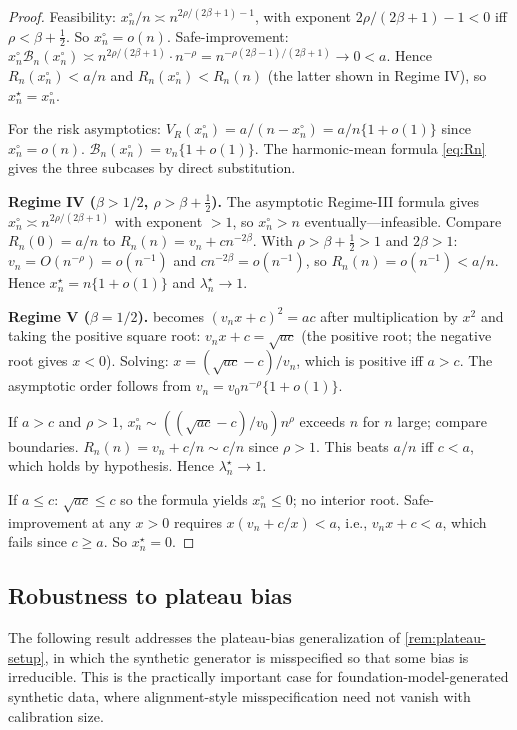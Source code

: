 \documentclass[11pt]{article}
\theoremstyle{plain}
\theoremstyle{definition}
\theoremstyle{remark}
\begin{document}
\begin{proof}
Feasibility: $x_n^\circ/n\asymp n^{2\rho/(2\beta+1)-1}$, with exponent $2\rho/(2\beta+1)-1<0$ iff $\rho<\beta+\tfrac12$. So $x_n^\circ=o(n)$. Safe-improvement: $x_n^\circ\mathcal{B}_n(x_n^\circ)\asymp n^{2\rho/(2\beta+1)}\cdot n^{-\rho}=n^{-\rho(2\beta-1)/(2\beta+1)}\to0<a$. Hence $R_n(x_n^\circ)<a/n$ and $R_n(x_n^\circ)<R_n(n)$ (the latter shown in Regime IV), so $x_n^\star=x_n^\circ$.

For the risk asymptotics: $V_R(x_n^\circ)=a/(n-x_n^\circ)=a/n\{1+o(1)\}$ since $x_n^\circ=o(n)$. $\mathcal{B}_n(x_n^\circ)=v_n\{1+o(1)\}$. The harmonic-mean formula \cref{eq:Rn} gives the three subcases by direct substitution.

\medskip
\noindent\textbf{Regime IV ($\beta>1/2$, $\rho>\beta+\tfrac12$).}
The asymptotic Regime-III formula gives $x_n^\circ\asymp n^{2\rho/(2\beta+1)}$ with exponent $>1$, so $x_n^\circ>n$ eventually---infeasible. Compare $R_n(0)=a/n$ to $R_n(n)=v_n+cn^{-2\beta}$. With $\rho>\beta+\tfrac12>1$ and $2\beta>1$: $v_n=O(n^{-\rho})=o(n^{-1})$ and $cn^{-2\beta}=o(n^{-1})$, so $R_n(n)=o(n^{-1})<a/n$. Hence $x_n^\star=n\{1+o(1)\}$ and $\lambda_n^\star\to1$.

\medskip
\noindent\textbf{Regime V ($\beta=1/2$).}
 becomes $(v_n x+c)^2=ac$ after multiplication by $x^2$ and taking the positive square root: $v_n x+c=\sqrt{ac}$ (the positive root; the negative root gives $x<0$). Solving: $x=(\sqrt{ac}-c)/v_n$, which is positive iff $a>c$. The asymptotic order follows from $v_n=v_0n^{-\rho}\{1+o(1)\}$.

If $a>c$ and $\rho>1$, $x_n^\circ\sim((\sqrt{ac}-c)/v_0)n^\rho$ exceeds $n$ for $n$ large; compare boundaries. $R_n(n)=v_n+c/n\sim c/n$ since $\rho>1$. This beats $a/n$ iff $c<a$, which holds by hypothesis. Hence $\lambda_n^\star\to1$.

If $a\le c$: $\sqrt{ac}\le c$ so the formula yields $x_n^\circ\le0$; no interior root. Safe-improvement at any $x>0$ requires $x(v_n+c/x)<a$, i.e., $v_nx+c<a$, which fails since $c\ge a$. So $x_n^\star=0$.
\end{proof}

\subsection{Robustness to plateau bias}
\label{ssec:plateau}

The following result addresses the plateau-bias generalization of \cref{rem:plateau-setup}, in which the synthetic generator is misspecified so that some bias is irreducible. This is the practically important case for foundation-model-generated synthetic data, where alignment-style misspecification need not vanish with calibration size.
\end{document}
